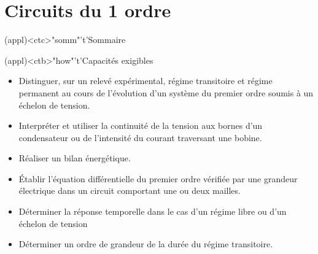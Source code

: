 \documentclass[../../main/main.tex]{subfiles}
\begin{document}
\setcounter{chapter}{2}


\chapter{Circuits du 1\ier{} ordre}

\vspace*{\fill}

\begin{tcn}(appl)<ctc>"somm"'t'{Sommaire}
	\let\item\olditem
	\vspace{-15pt}
	\minitoc
	\vspace{-25pt}
\end{tcn}

\begin{tcn}[sidebyside](appl)<ctb>"how"'t'{Capacités exigibles}
	\begin{itemize}[label=\rcheck]
			\item Distinguer, sur un relevé expérimental, régime transitoire et
			      régime permanent au cours de l'évolution d'un système du premier
			      ordre soumis à un échelon de tension.
			\item Interpréter et utiliser la continuité de la tension aux bornes d'un
			      condensateur ou de l'intensité du courant traversant une bobine.
			\item Réaliser un bilan énergétique.
	\end{itemize}
	\tcblower
	\begin{itemize}[label=\rcheck]
			\item Établir l'équation différentielle du premier ordre vérifiée par une
			      grandeur électrique dans un circuit comportant une ou deux mailles.
			\item Déterminer la réponse temporelle dans le cas d'un régime libre ou
			      d'un échelon de tension
			\item Déterminer un ordre de grandeur de la durée du régime transitoire.
	\end{itemize}
\end{tcn}

\vspace*{\fill}
\newpage
\vspace*{\fill}
\end{document}

